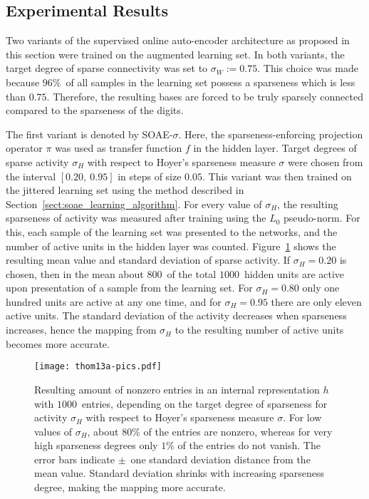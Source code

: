 \documentclass[twoside,11pt]{article}
\newcommand{\intervalcc}[2]{\left[#1,\ #2\right]}
\newcommand{\0}{\mathcal{O}}
\begin{document}
\subsection{Experimental Results}
\label{sect:experimental_results}
Two variants of the supervised online auto-encoder architecture as proposed in this section were trained on the augmented learning set.
In both variants, the target degree of sparse connectivity was set to $\sigma_W := 0.75$.
This choice was made because $96\%$~of all samples in the learning set possess a sparseness which is less than $0.75$.
Therefore, the resulting bases are forced to be truly sparsely connected compared to the sparseness of the digits.

The first variant is denoted by SOAE-$\sigma$.
Here, the sparseness-enforcing projection operator $\pi$ was used as transfer function $f$ in the hidden layer.
Target degrees of sparse activity $\sigma_H$ with respect to Hoyer's sparseness measure $\sigma$ were chosen from the interval $\intervalcc{0.20}{0.95}$ in steps of size $0.05$.
This variant was then trained on the jittered learning set using the method described in Section~\ref{sect:soae_learning_algorithm}.
For every value of $\sigma_H$, the resulting sparseness of activity was measured after training using the $L_0$ pseudo-norm.
For this, each sample of the learning set was presented to the networks, and the number of active units in the hidden layer was counted.
Figure~\ref{fig:soae-sigma-l0-connection} shows the resulting mean value and standard deviation of sparse activity.
If $\sigma_H = 0.20$ is chosen, then in the mean about $800$~of the total $1000$~hidden units are active upon presentation of a sample from the learning set.
For $\sigma_H = 0.80$ only one hundred units are active at any one time, and for $\sigma_H = 0.95$ there are only eleven active units.
The standard deviation of the activity decreases when sparseness increases, hence the mapping from $\sigma_H$ to the resulting number of active units becomes more accurate.

\begin{figure}[p]
  \centering
  \texttt{[image: thom13a-pics.pdf]}
  \caption{Resulting amount of nonzero entries in an internal representation $h$ with $1000$~entries, depending on the target degree of sparseness for activity $\sigma_H$ with respect to Hoyer's sparseness measure $\sigma$. For low values of $\sigma_H$, about $80\%$ of the entries are nonzero, whereas for very high sparseness degrees only $1\%$ of the entries do not vanish. The error bars indicate $\pm$~one standard deviation distance from the mean value. Standard deviation shrinks with increasing sparseness degree, making the mapping more accurate.}
  \label{fig:soae-sigma-l0-connection}
\end{figure}
\end{document}
